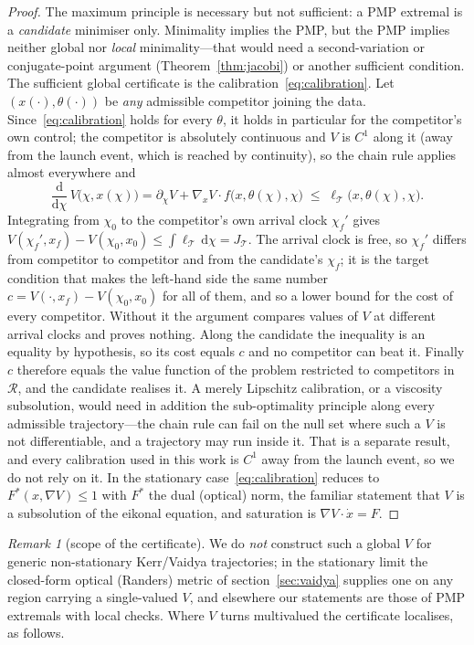 \documentclass[12pt]{iopart}
\newcommand{\dd}{\mathrm{d}}
\theoremstyle{plain}
\theoremstyle{definition}
\theoremstyle{plain}
\theoremstyle{remark}
\newtheorem*{remark}{Remark}
\begin{document}
\begin{proof}
The maximum principle is necessary but not sufficient: a PMP extremal is a
\emph{candidate} minimiser only. Minimality implies the PMP, but the PMP implies
neither global nor \emph{local} minimality---that would need a second-variation
or conjugate-point argument (Theorem~\ref{thm:jacobi}) or another sufficient
condition. The sufficient global certificate is the
calibration~\eqref{eq:calibration}. Let $(x(\cdot),\theta(\cdot))$ be
\emph{any} admissible competitor joining the data. Since~\eqref{eq:calibration} holds for
every $\theta$, it holds in particular for the competitor's own control; the competitor is
absolutely continuous and $V$ is $C^1$ along it (away from the launch event, which is
reached by continuity), so the chain rule applies almost everywhere and
\[
   \frac{\dd}{\dd\chi}\,V\big(\chi,x(\chi)\big)
   =\partial_\chi V+\nabla_x V\cdot f\big(x,\theta(\chi),\chi\big)
   \;\le\;\ell_{\mathcal T}\big(x,\theta(\chi),\chi\big).
\]
Integrating from $\chi_0$ to the competitor's own arrival clock $\chi_f'$ gives
$V(\chi_f',x_f)-V(\chi_0,x_0)\le\int\ell_{\mathcal T}\,\dd\chi=J_{\mathcal T}$. The arrival
clock is free, so $\chi_f'$ differs from competitor to competitor and from the
candidate's $\chi_f$; it is the target condition that makes the left-hand side the same
number $c=V(\cdot,x_f)-V(\chi_0,x_0)$ for all of them, and so a lower bound for the cost of
every competitor. Without it the argument compares values of $V$ at different arrival
clocks and proves nothing. Along the candidate the inequality is an equality by
hypothesis, so its cost equals $c$ and no competitor can beat it. Finally $c$ therefore equals the value function of the problem restricted to competitors
in $\mathcal R$, and the candidate realises it. A merely
Lipschitz calibration, or a viscosity subsolution, would need in addition the
sub-optimality principle along every admissible trajectory---the chain rule can fail on
the null set where such a $V$ is not differentiable, and a trajectory may run inside it.
That is a separate result, and every calibration used in this work is $C^1$ away from the
launch event, so we do not rely on it. In the stationary case~\eqref{eq:calibration} reduces to
$F^\ast(x,\nabla V)\le1$ with $F^\ast$ the dual (optical) norm, the familiar statement
that $V$ is a subsolution of the eikonal equation, and saturation is
$\nabla V\cdot\dot x=F$.
\end{proof}

\begin{remark}[scope of the certificate]
We do \emph{not} construct such a global $V$ for generic non-stationary Kerr/Vaidya
trajectories; in the stationary limit the closed-form optical (Randers) metric of
section~\ref{sec:vaidya} supplies one on any region carrying a single-valued $V$, and
elsewhere our statements are those of PMP extremals with local checks. Where $V$ turns
multivalued the certificate localises, as follows.
\end{remark}
\end{document}
